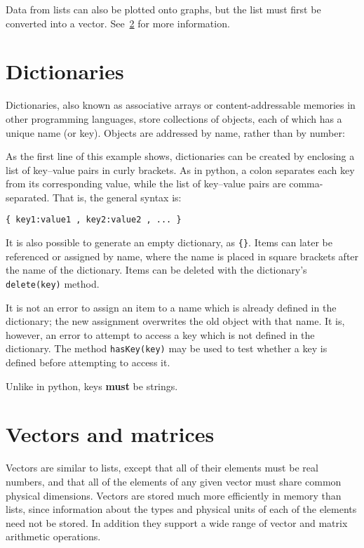 Data from lists can also be plotted onto graphs, but the list must first be
converted into a vector. See~\ref{sec:vectors} for more information.

\section{Dictionaries}

Dictionaries, also known as associative arrays or content-addressable memories
in other programming languages, store collections of objects, each of which has
a unique name (or key). Objects are addressed by name, rather than by number:

\vspace{3mm}

\vspace{3mm}

As the first line of this example shows, dictionaries can be created by
enclosing a list of key--value pairs in curly brackets. As in python, a colon
separates each key from its corresponding value, while the list of key--value
pairs are comma-separated. That is, the general syntax is:
\begin{verbatim}
{ key1:value1 , key2:value2 , ... }
\end{verbatim}

It is also possible to generate an empty dictionary, as {\tt \{\}}. Items can
later be referenced or assigned by name, where the name is placed in square
brackets after the name of the dictionary. Items can be deleted with the
dictionary's {\tt delete(key)} method.

It is not an error to assign an item to a name which is already defined in the
dictionary; the new assignment overwrites the old object with that name. It is,
however, an error to attempt to access a key which is not defined in the
dictionary. The method {\tt hasKey(key)} may be used to test whether a key is
defined before attempting to access it.

Unlike in python, keys {\bf must} be strings.

\section{Vectors and matrices}
\label{sec:vectors}

Vectors are similar to lists, except that all of their elements must be real
numbers, and that all of the elements of any given vector must share common
physical dimensions.  Vectors are stored much more efficiently in memory than
lists, since information about the types and physical units of each of the
elements need not be stored. In addition they support a wide range of vector
and matrix arithmetic operations.

